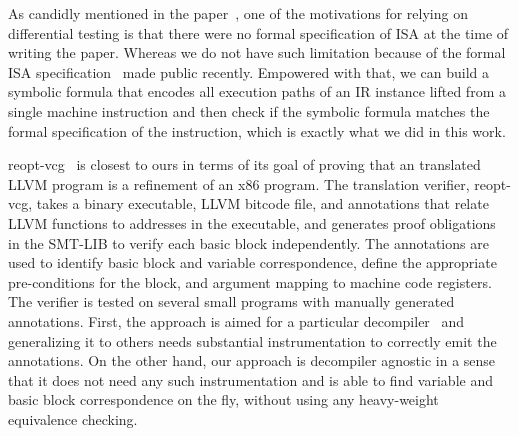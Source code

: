 
As candidly mentioned in the paper~\cite{ASE2017}, one of the motivations for 
relying on differential testing  is that there were no 
formal specification of \ISA ISA at the time of 
writing the paper. Whereas we do not have such limitation because of the formal 
\ISA ISA specification~\cite{DasguptaAdve:PLDI19} made public recently.
Empowered with that, we can build a symbolic formula that encodes all execution 
paths of an IR instance lifted from a single machine instruction and then  
check if the symbolic formula matches the formal specification of the 
instruction, which is exactly what we did in this work.

 
reopt-vcg~\cite{Galois:SPISA19} is closest to ours in terms of its goal of
proving that an translated LLVM program is a refinement of an x86 program.  The
translation verifier, reopt-vcg, takes a binary executable, LLVM bitcode file,
            and annotations that relate LLVM functions to addresses in the
            executable, and generates proof obligations in the SMT-LIB to
            verify each basic block independently. The annotations are used to
            identify basic block and variable correspondence, define the
            appropriate pre-conditions for the block, and argument mapping to
            machine code registers. The verifier is tested on several small
            programs with manually generated annotations. First, the approach
            is aimed for a particular decompiler~\cite{reopt} and generalizing
            it to others needs substantial instrumentation to correctly emit the
            annotations. On the other hand, our approach is decompiler agnostic
            in a sense that it does not need any such instrumentation  and is
            able to find variable and basic block correspondence on the fly,
            without using any heavy-weight equivalence checking. 


